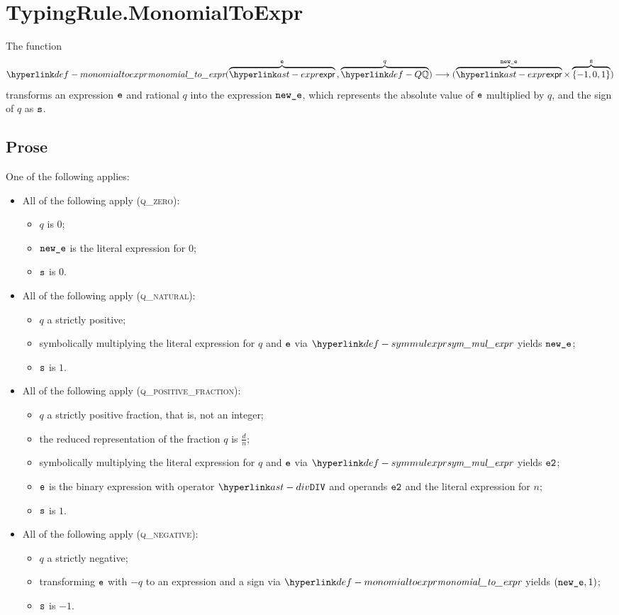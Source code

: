\section{TypingRule.MonomialToExpr \label{sec:TypingRule.MonomialToExpr}}
\hypertarget{def-monomialtoexpr}{}
The function
\[
\monomialtoexpr(\overname{\expr}{\ve} \aslsep \overname{\Q}{q})
\aslto (\overname{\expr}{\newe} \times \overname{\{-1,0,1\}}{\vs})
\]
transforms an expression $\texttt{e}$ and rational $q$ into the expression $\texttt{new\_e}$,
which represents the absolute value of $\texttt{e}$ multiplied by $q$, and the sign of $q$ as $\texttt{s}$.

\subsection{Prose}
One of the following applies:
\begin{itemize}
  \item All of the following apply (\textsc{q\_zero}):
  \begin{itemize}
    \item $q$ is $0$;
    \item $\texttt{new\_e}$ is the literal expression for $0$;
    \item $\texttt{s}$ is $0$.
  \end{itemize}

  \item All of the following apply (\textsc{q\_natural}):
  \begin{itemize}
    \item $q$ a strictly positive;
    \item symbolically multiplying the literal expression for $q$ and $\texttt{e}$ via $\symmulexpr$ yields $\texttt{new\_e}$;
    \item $\texttt{s}$ is $1$.
  \end{itemize}

  \item All of the following apply (\textsc{q\_positive\_fraction}):
  \begin{itemize}
    \item $q$ a strictly positive fraction, that is, not an integer;
    \item the reduced representation of the fraction $q$ is $\frac{d}{n}$;
    \item symbolically multiplying the literal expression for $q$ and $\texttt{e}$ via $\symmulexpr$ yields $\texttt{e2}$;
    \item $\texttt{e}$ is the binary expression with operator $\DIV$ and operands $\texttt{e2}$ and the literal expression for $n$;
    \item $\texttt{s}$ is $1$.
  \end{itemize}

  \item All of the following apply (\textsc{q\_negative}):
  \begin{itemize}
    \item $q$ a strictly negative;
    \item transforming $\texttt{e}$ with $-q$ to an expression and a sign via $\monomialtoexpr$ yields $(\texttt{new\_e}, 1)$;
    \item $\texttt{s}$ is $-1$.
  \end{itemize}
\end{itemize}

